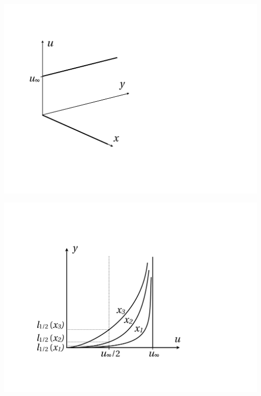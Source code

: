 		 \begin{center}
		 \begin{minipage}{0.28\textwidth}
	 		\begin{center}
	 		\includegraphics[scale=0.24]{ch5/3}
	 		\end{center}
	 		\label{fig:5.3}
	 \end{minipage}
	 	 \begin{minipage}{0.4\textwidth}
			 \begin{center}
			 \includegraphics[scale=0.24]{ch5/4} 
			 \end{center}
	 		\label{fig:5.4}
	 \end{minipage}
	 	 \begin{minipage}{0.3\textwidth}

\end{minipage}
\end{center}
